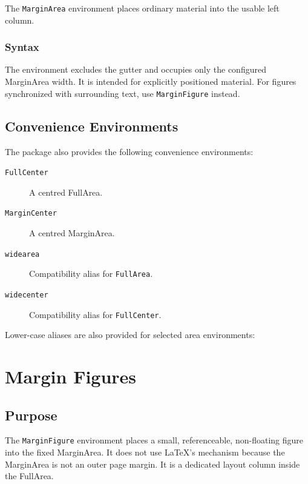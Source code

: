 \documentclass[
11pt,
a4paper,
oneside
]{scrbook}
\begin{document}
The \texttt{MarginArea} environment places ordinary material into the usable
left column.

\subsection{Syntax}





The environment excludes the gutter and occupies only the configured
MarginArea width.
It is intended for explicitly positioned material.
For figures synchronized with surrounding text, use
\texttt{MarginFigure} instead.

\section{Convenience Environments}

The package also provides the following convenience environments:
\begin{description}
	\item[\texttt{FullCenter}]
	A centred FullArea.
	
	\item[\texttt{MarginCenter}]
	A centred MarginArea.
	
	\item[\texttt{widearea}]
	Compatibility alias for \texttt{FullArea}.
	
	\item[\texttt{widecenter}]
	Compatibility alias for \texttt{FullCenter}.
\end{description}
Lower-case aliases are also provided for selected area environments:







\chapter{Margin Figures}
\label{chap:margin-figures}

\section{Purpose}

The \texttt{MarginFigure} environment places a small, referenceable,
non-floating figure into the fixed MarginArea.
It does not use LaTeX's  mechanism because the MarginArea is
not an outer page margin.
It is a dedicated layout column inside the FullArea.
\end{document}
